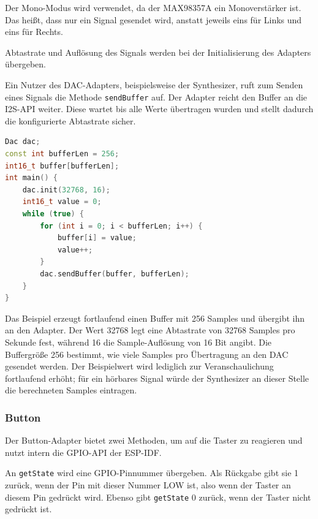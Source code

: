 Der Mono-Modus wird verwendet, da der MAX98357A ein Monoverstärker ist.
Das heißt, dass nur ein Signal gesendet wird, anstatt jeweils eins für 
Links und
eins für Rechts. 

Abtastrate und Auflösung des Signals werden bei der Initialisierung des
Adapters übergeben.

Ein Nutzer des DAC-Adapters, beispielsweise der Synthesizer, ruft zum Senden
eines Signals die Methode \lstinline|sendBuffer| auf. Der Adapter reicht den
Buffer an die I2S-API weiter. Diese wartet bis alle Werte übertragen wurden
und stellt dadurch die konfigurierte Abtastrate sicher.

\begin{lstlisting}[language=C++, 
                   frame=single, 
                   caption={Beispiel Code zum Dac Port},
                   captionpos=b]
Dac dac;
const int bufferLen = 256;
int16_t buffer[bufferLen];
int main() {
    dac.init(32768, 16);
    int16_t value = 0;
    while (true) {
        for (int i = 0; i < bufferLen; i++) {
            buffer[i] = value;
            value++;
        }
        dac.sendBuffer(buffer, bufferLen);
    }
}
\end{lstlisting}

Das Beispiel erzeugt fortlaufend einen Buffer mit 256 Samples und übergibt
ihn an den Adapter. Der Wert 32768 legt eine Abtastrate von 32768 Samples pro
Sekunde fest, während 16 die Sample-Auflösung von 16 Bit angibt. Die
Buffergröße 256 bestimmt, wie viele Samples pro Übertragung an den DAC
gesendet werden. Der Beispielwert wird lediglich zur Veranschaulichung
fortlaufend erhöht; für ein hörbares Signal würde der Synthesizer an dieser
Stelle die berechneten Samples eintragen.

\subsubsection{Button}
Der Button-Adapter bietet zwei Methoden, um auf die Taster zu reagieren
und nutzt intern die GPIO-API \cite{esp32S3gpio} der ESP-IDF.

An \lstinline|getState| wird eine GPIO-Pinnummer übergeben. Als
Rückgabe gibt sie 1 zurück, wenn der Pin mit dieser Nummer LOW ist, 
also wenn der Taster an diesem Pin gedrückt wird. 
Ebenso gibt \lstinline|getState| 0 zurück, wenn der Taster nicht gedrückt ist.

